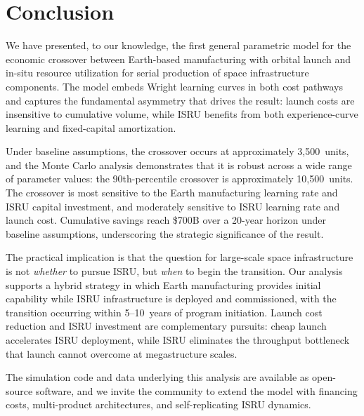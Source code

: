 \documentclass[preprint,12pt]{elsarticle}
\begin{document}
\section{Conclusion}
\label{sec:conclusion}

We have presented, to our knowledge, the first general parametric model for the economic crossover between Earth-based manufacturing with orbital launch and in-situ resource utilization for serial production of space infrastructure components. The model embeds Wright learning curves in both cost pathways and captures the fundamental asymmetry that drives the result: launch costs are insensitive to cumulative volume, while ISRU benefits from both experience-curve learning and fixed-capital amortization.

Under baseline assumptions, the crossover occurs at approximately 3{,}500~units, and the Monte Carlo analysis demonstrates that it is robust across a wide range of parameter values: the 90th-percentile crossover is approximately 10{,}500~units. The crossover is most sensitive to the Earth manufacturing learning rate and ISRU capital investment, and moderately sensitive to ISRU learning rate and launch cost. Cumulative savings reach \$700B over a 20-year horizon under baseline assumptions, underscoring the strategic significance of the result.

The practical implication is that the question for large-scale space infrastructure is not \emph{whether} to pursue ISRU, but \emph{when} to begin the transition. Our analysis supports a hybrid strategy in which Earth manufacturing provides initial capability while ISRU infrastructure is deployed and commissioned, with the transition occurring within 5--10~years of program initiation. Launch cost reduction and ISRU investment are complementary pursuits: cheap launch accelerates ISRU deployment, while ISRU eliminates the throughput bottleneck that launch cannot overcome at megastructure scales.

The simulation code and data underlying this analysis are available as open-source software, and we invite the community to extend the model with financing costs, multi-product architectures, and self-replicating ISRU dynamics.

\end{document}
